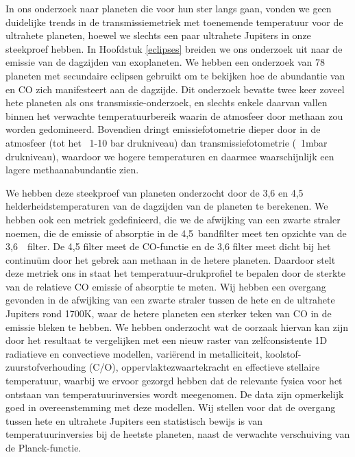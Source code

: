 In ons onderzoek naar planeten die voor hun ster langs gaan, vonden we geen duidelijke trends in de transmissiemetriek met toenemende temperatuur voor de ultrahete planeten, hoewel we slechts een paar ultrahete Jupiters in onze steekproef hebben. In Hoofdstuk \ref{eclipses} breiden we ons onderzoek uit naar de emissie van de dagzijden van exoplaneten. We hebben een onderzoek van 78 planeten met secundaire eclipsen gebruikt om te bekijken hoe de abundantie van  en CO zich manifesteert aan de dagzijde. Dit onderzoek bevatte twee keer zoveel hete planeten als ons transmissie-onderzoek, en slechts enkele daarvan vallen binnen het verwachte temperatuurbereik waarin de atmosfeer door methaan zou worden gedomineerd. Bovendien dringt emissiefotometrie dieper door in de atmosfeer (tot het ~1-10 bar drukniveau) dan transmissiefotometrie (~1mbar drukniveau), waardoor we hogere temperaturen en daarmee waarschijnlijk een lagere methaanabundantie zien.

We hebben deze steekproef van planeten onderzocht door de 3,6 en 4,5~\um~ helderheidstemperaturen van de dagzijden van de planeten te berekenen. We hebben ook een metriek gedefinieerd, die we de afwijking van een zwarte straler noemen, die de emissie of absorptie in de 4,5~\um bandfilter meet ten opzichte van de 3,6~\um~filter. De 4,5 \um filter meet de CO-functie en de 3,6 \um filter meet dicht bij het continuüm door het gebrek aan methaan in de hetere planeten. Daardoor stelt deze metriek ons in staat het temperatuur-drukprofiel te bepalen door de sterkte van de relatieve CO emissie of absorptie te meten. Wij hebben een overgang gevonden in de afwijking van een zwarte straler tussen de hete en de ultrahete Jupiters rond 1700K, waar de hetere planeten een sterker teken van CO in de emissie bleken te hebben. We hebben onderzocht wat de oorzaak hiervan kan zijn door het resultaat te vergelijken met een nieuw raster van zelfconsistente 1D radiatieve en convectieve modellen, variërend in metalliciteit, koolstof-zuurstofverhouding (C/O), oppervlaktezwaartekracht en effectieve stellaire temperatuur, waarbij we ervoor gezorgd hebben dat de relevante fysica voor het ontstaan van temperatuurinversies wordt meegenomen. De data zijn opmerkelijk goed in overeenstemming met deze modellen. Wij stellen voor dat de overgang tussen hete en ultrahete Jupiters een statistisch bewijs is van temperatuurinversies bij de heetste planeten, naast de verwachte verschuiving van de Planck-functie.

